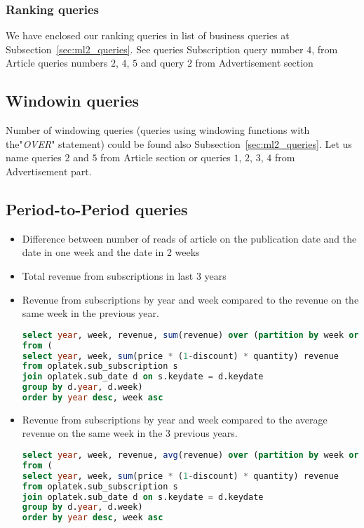 \subsubsection{Ranking queries} %
\label{ssub:Ranking queries}
We have enclosed our ranking queries in list of business queries at Subsection~\ref{sec:ml2_queries}.
See queries Subscription query number $4$, from Article queries numbers $2$, $4$, $5$
and query $2$ from Advertisement section

\subsection{Windowin queries} %
\label{sub:Windowin queries}
Number of windowing queries (queries using windowing functions with the"{\it OVER}" statement)
could be found also Subsection~\ref{sec:ml2_queries}.
Let us name queries $2$ and $5$ from Article section or queries $1$, $2$, $3$, $4$ from Advertisement part.

\subsection{Period-to-Period queries} %
    \begin{itemize}
        \item Difference between number of reads of article on the publication date and the date in one week and the date in 2 weeks
        \item Total revenue from subscriptions in last 3 years
    \end{itemize}
\label{sub:Period-to-Period queries}
\begin{itemize}
    \item Revenue from subscriptions by year and week compared to the revenue on the same week in the previous year.
\begin{lstlisting}[language=sql] 
select year, week, revenue, sum(revenue) over (partition by week order by year RANGE BETWEEN 1 PRECEDING AND 1 PRECEDING) revenue_last_year_this_week        
from (
select year, week, sum(price * (1-discount) * quantity) revenue 
from oplatek.sub_subscription s 
join oplatek.sub_date d on s.keydate = d.keydate 
group by d.year, d.week)
order by year desc, week asc
\end{lstlisting}

\item Revenue from subscriptions by year and week compared to the average revenue on the same week in the 3 previous years.
\begin{lstlisting}[language=sql] 
select year, week, revenue, avg(revenue) over (partition by week order by year RANGE BETWEEN 3 PRECEDING AND 1 PRECEDING) avg_revenue_prev_3_years        
from (
select year, week, sum(price * (1-discount) * quantity) revenue 
from oplatek.sub_subscription s 
join oplatek.sub_date d on s.keydate = d.keydate
group by d.year, d.week)
order by year desc, week asc
\end{lstlisting}

\end{itemize}

